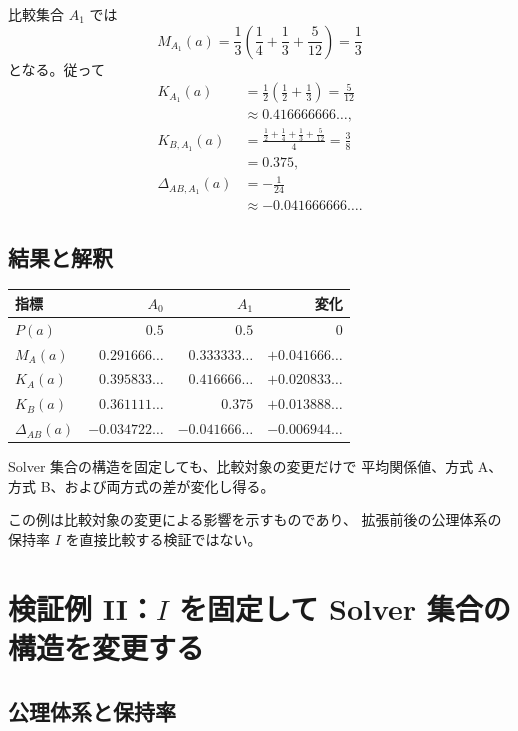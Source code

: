 \documentclass[a4paper,11pt]{ltjsarticle}
\begin{document}
比較集合 $A_1$ では
\begin{equation}
  M_{A_1}(a)
  =
  \frac13\left(\frac14+\frac13+\frac5{12}\right)
  =\frac13
\end{equation}
となる。従って
\begin{align}
  K_{A_1}(a)
  &=\frac12\left(\frac12+\frac13\right)
    =\frac5{12}\\
  &\approx0.416666666\ldots,\\
  K_{B,A_1}(a)
  &=\frac{\frac12+\frac14+\frac13+\frac5{12}}4
    =\frac38\\
  &=0.375,\\
  \Delta_{AB,A_1}(a)
  &=-\frac1{24}\\
  &\approx-0.041666666\ldots.
\end{align}

\subsection{結果と解釈}

\begin{center}
\begin{tabular}{lrrr}
\toprule
指標 & $A_0$ & $A_1$ & 変化\\
\midrule
$P(a)$ & $0.5$ & $0.5$ & $0$\\
$M_A(a)$ & $0.291666\ldots$ & $0.333333\ldots$ & $+0.041666\ldots$\\
$K_A(a)$ & $0.395833\ldots$ & $0.416666\ldots$ & $+0.020833\ldots$\\
$K_B(a)$ & $0.361111\ldots$ & $0.375$ & $+0.013888\ldots$\\
$\Delta_{AB}(a)$ & $-0.034722\ldots$ & $-0.041666\ldots$ & $-0.006944\ldots$\\
\bottomrule
\end{tabular}
\end{center}

Solver 集合の構造を固定しても、比較対象の変更だけで
平均関係値、方式 A、方式 B、および両方式の差が変化し得る。

この例は比較対象の変更による影響を示すものであり、
拡張前後の公理体系の保持率 $I$ を直接比較する検証ではない。

\section{検証例 II：$I$ を固定して Solver 集合の構造を変更する}

\subsection{公理体系と保持率}
\end{document}
